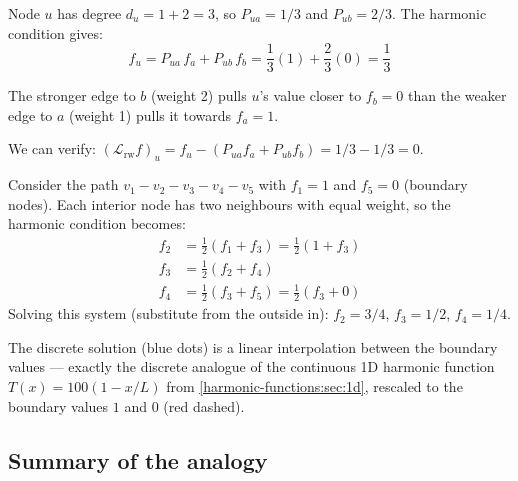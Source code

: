 \begin{notechapter}
\begin{example}
Node $u$ has degree $d_u = 1 + 2 = 3$, so $P_{ua} = 1/3$ and
$P_{ub} = 2/3$. The harmonic condition gives:
\[
f_u = P_{ua}\,f_a + P_{ub}\,f_b = \frac{1}{3}(1) + \frac{2}{3}(0)
= \frac{1}{3}
\]

The stronger edge to $b$ (weight 2) pulls $u$'s value closer to $f_b = 0$
than the weaker edge to $a$ (weight 1) pulls it towards $f_a = 1$.

We can verify: $(\mathcal{L}_{\mathrm{rw}} f)_u = f_u - (P_{ua}f_a +
P_{ub}f_b) = 1/3 - 1/3 = 0$.
\end{example}

\begin{example}
Consider the path $v_1 - v_2 - v_3 - v_4 - v_5$ with $f_1 = 1$ and
$f_5 = 0$ (boundary nodes). Each interior node has two neighbours with
equal weight, so the harmonic condition becomes:
\begin{align}
f_2 &= \tfrac{1}{2}(f_1 + f_3) = \tfrac{1}{2}(1 + f_3) \\
f_3 &= \tfrac{1}{2}(f_2 + f_4) \\
f_4 &= \tfrac{1}{2}(f_3 + f_5) = \tfrac{1}{2}(f_3 + 0)
\end{align}
Solving this system (substitute from the outside in): $f_2 = 3/4$,
$f_3 = 1/2$, $f_4 = 1/4$.

\begin{center}
\end{center}

The discrete solution (blue dots) is a linear interpolation between the
boundary values --- exactly the discrete analogue of the continuous 1D
harmonic function $T(x) = 100(1 - x/L)$ from \cref{harmonic-functions:sec:1d}, rescaled to the boundary values $1$ and $0$ (red dashed).
\end{example}

\subsection{Summary of the analogy}


\end{notechapter}
